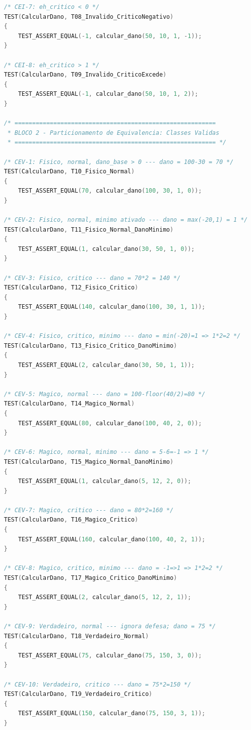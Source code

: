 \documentclass[conference, onecolumn]{IEEEtran}
\begin{document}
\begin{lstlisting}[language=C, caption={TestCalcularDano.c --- suíte de 47 testes funcionais.}]
/* CEI-7: eh_critico < 0 */
TEST(CalcularDano, T08_Invalido_CriticoNegativo)
{
    TEST_ASSERT_EQUAL(-1, calcular_dano(50, 10, 1, -1));
}

/* CEI-8: eh_critico > 1 */
TEST(CalcularDano, T09_Invalido_CriticoExcede)
{
    TEST_ASSERT_EQUAL(-1, calcular_dano(50, 10, 1, 2));
}

/* =========================================================
 * BLOCO 2 - Particionamento de Equivalencia: Classes Validas
 * ========================================================= */

/* CEV-1: Fisico, normal, dano_base > 0 --- dano = 100-30 = 70 */
TEST(CalcularDano, T10_Fisico_Normal)
{
    TEST_ASSERT_EQUAL(70, calcular_dano(100, 30, 1, 0));
}

/* CEV-2: Fisico, normal, minimo ativado --- dano = max(-20,1) = 1 */
TEST(CalcularDano, T11_Fisico_Normal_DanoMinimo)
{
    TEST_ASSERT_EQUAL(1, calcular_dano(30, 50, 1, 0));
}

/* CEV-3: Fisico, critico --- dano = 70*2 = 140 */
TEST(CalcularDano, T12_Fisico_Critico)
{
    TEST_ASSERT_EQUAL(140, calcular_dano(100, 30, 1, 1));
}

/* CEV-4: Fisico, critico, minimo --- dano = min(-20)=1 => 1*2=2 */
TEST(CalcularDano, T13_Fisico_Critico_DanoMinimo)
{
    TEST_ASSERT_EQUAL(2, calcular_dano(30, 50, 1, 1));
}

/* CEV-5: Magico, normal --- dano = 100-floor(40/2)=80 */
TEST(CalcularDano, T14_Magico_Normal)
{
    TEST_ASSERT_EQUAL(80, calcular_dano(100, 40, 2, 0));
}

/* CEV-6: Magico, normal, minimo --- dano = 5-6=-1 => 1 */
TEST(CalcularDano, T15_Magico_Normal_DanoMinimo)
{
    TEST_ASSERT_EQUAL(1, calcular_dano(5, 12, 2, 0));
}

/* CEV-7: Magico, critico --- dano = 80*2=160 */
TEST(CalcularDano, T16_Magico_Critico)
{
    TEST_ASSERT_EQUAL(160, calcular_dano(100, 40, 2, 1));
}

/* CEV-8: Magico, critico, minimo --- dano = -1=>1 => 1*2=2 */
TEST(CalcularDano, T17_Magico_Critico_DanoMinimo)
{
    TEST_ASSERT_EQUAL(2, calcular_dano(5, 12, 2, 1));
}

/* CEV-9: Verdadeiro, normal --- ignora defesa; dano = 75 */
TEST(CalcularDano, T18_Verdadeiro_Normal)
{
    TEST_ASSERT_EQUAL(75, calcular_dano(75, 150, 3, 0));
}

/* CEV-10: Verdadeiro, critico --- dano = 75*2=150 */
TEST(CalcularDano, T19_Verdadeiro_Critico)
{
    TEST_ASSERT_EQUAL(150, calcular_dano(75, 150, 3, 1));
}


\end{lstlisting}
\end{document}
